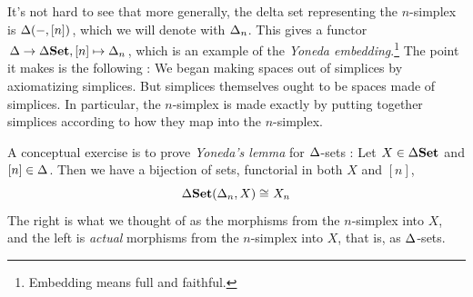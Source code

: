 \documentclass{article}
\begin{document}
\begin{eg}
  It's not hard to see that more generally,
  the delta set representing the $n$-simplex is 
  $\Delta(-,[n])$, which we will denote with $\Delta_n$.
  This gives a functor 
  $\Delta \to \Delta\mathbf{Set}, [n] \mapsto \Delta_n$,
  which is an example of the \emph{Yoneda embedding}.\footnote{
    Embedding means full and faithful.
  }
  The point it makes is the following : 
  We began making spaces out of simplices by axiomatizing simplices.
  But simplices themselves ought to be spaces made of simplices.
  In particular, the $n$-simplex is made exactly by 
  putting together simplices according to how they map into the $n$-simplex.

  A conceptual exercise is to prove \emph{Yoneda's lemma} for 
  $\Delta$-sets : 
  Let $X \in \Delta\mathbf{Set}$ and $[n] \in \Delta$.
  Then we have a bijection of sets, functorial in both $X$ and $[n]$,
  \[
    \Delta\mathbf{Set}(\Delta_n, X) \cong_{} X_n
  \]
  The right is what we thought of as the morphisms 
  from the $n$-simplex into $X$,
  and the left is \emph{actual} morphisms from the $n$-simplex into $X$,
  that is, as $\Delta$-sets.
\end{eg}

\end{document}
